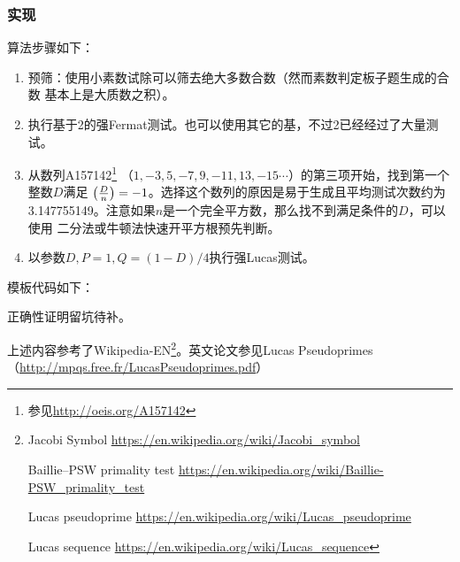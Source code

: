 \subsubsection{实现}

算法步骤如下：
\begin{enumerate}
    \item 预筛：使用小素数试除可以筛去绝大多数合数（然而素数判定板子题生成的合数
    基本上是大质数之积）。
    \item 执行基于2的强Fermat测试。也可以使用其它的基，不过2已经经过了大量测试。
    \item 从数列A157142\footnote{参见\url{http://oeis.org/A157142}}
    （$1,-3,5,-7,9,-11,13,-15\cdots$）的第三项开始，找到第一个整数$D$满足
    $\left(\frac{D}{n}\right)=-1$。选择这个数列的原因是易于生成且平均测试次数约为
    3.147755149。注意如果$n$是一个完全平方数，那么找不到满足条件的$D$，可以使用
    二分法或牛顿法快速开平方根预先判断。
    \item 以参数$D,P=1,Q=(1-D)/4$执行强Lucas测试。
\end{enumerate}

模板代码如下：


正确性证明留坑待补。

上述内容参考了Wikipedia-EN\footnote{
    Jacobi Symbol
    \url{https://en.wikipedia.org/wiki/Jacobi\_symbol}

    Baillie–PSW primality test
    \url{https://en.wikipedia.org/wiki/Baillie-PSW\_primality\_test}

    Lucas pseudoprime
    \url{https://en.wikipedia.org/wiki/Lucas\_pseudoprime}

    Lucas sequence
    \url{https://en.wikipedia.org/wiki/Lucas\_sequence}
}。英文论文参见Lucas Pseudoprimes\cite{BPSW}
（\url{http://mpqs.free.fr/LucasPseudoprimes.pdf}）
